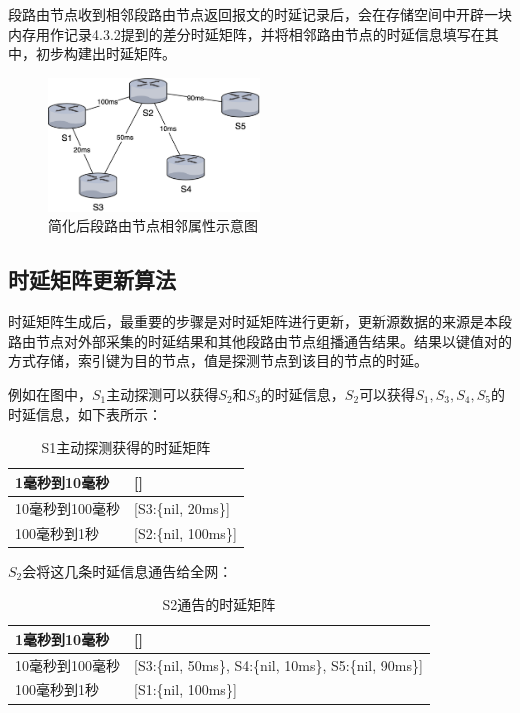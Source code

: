 段路由节点收到相邻段路由节点返回报文的时延记录后，会在存储空间中开辟一块内存用作记录4.3.2提到的差分时延矩阵，并将相邻路由节点的时延信息填写在其中，初步构建出时延矩阵。

\begin{figure}[htbp]
\setlength{\abovecaptionskip}{15pt plus 3pt minus 2pt}
\centerline{\includegraphics[width=0.5\textwidth]{./figures/ch4-simple-topo.png}}
\caption{简化后段路由节点相邻属性示意图}
\label{fig-ch4-simple-topo}
\end{figure}

\subsection{时延矩阵更新算法}

时延矩阵生成后，最重要的步骤是对时延矩阵进行更新，更新源数据的来源是本段路由节点对外部采集的时延结果和其他段路由节点组播通告结果。结果以键值对的方式存储，索引键为目的节点，值是探测节点到该目的节点的时延。

例如在图中，$S_1$主动探测可以获得$S_2$和$S_3$的时延信息，$S_2$可以获得$S_1, S_3, S_4, S_5$的时延信息，如下表所示：

\begin{table}[htbp]
\begin{tabular}{|p{}|p{}|}
\hline
1毫秒到10毫秒 & {[}{]} \\ \hline
10毫秒到100毫秒 & {[}S3:\{nil, 20ms\}{]} \\ \hline
100毫秒到1秒 & {[}S2:\{nil, 100ms\}{]} \\ \hline
\end{tabular}
\caption{S1主动探测获得的时延矩阵}
\label{table-S1-get}
\end{table}

$S_2$会将这几条时延信息通告给全网：

\begin{table}[htbp]
\begin{tabular}{|p{}|p{}|}\hline
1毫秒到10毫秒 & {[}{]} \\ \hline
10毫秒到100毫秒 & {[}S3:\{nil, 50ms\}, S4:\{nil, 10ms\}, S5:\{nil, 90ms\}{]} \\ \hline
100毫秒到1秒 & {[}S1:\{nil, 100ms\}{]} \\ \hline
\end{tabular}
\caption{S2通告的时延矩阵}
\label{table-S2-adverse}
\end{table}

